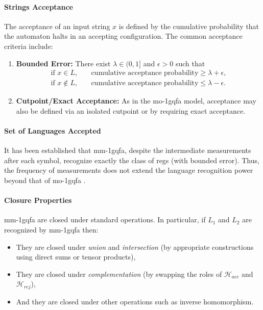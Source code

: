 \paragraph{Strings Acceptance}  
The acceptance of an input string $x$ is defined by the cumulative probability that the automaton halts in an accepting configuration. The common acceptance criteria include:
\begin{enumerate}
  \item \textbf{Bounded Error:} There exist $\lambda\in(0,1]$ and $\epsilon>0$ such that
  \[
  \begin{aligned}
  \text{if } x\in L,&\quad \text{cumulative acceptance probability} \ge \lambda+\epsilon,\\[1mm]
  \text{if } x\notin L,&\quad \text{cumulative acceptance probability} \le \lambda-\epsilon.
  \end{aligned}
  \]
  \item \textbf{Cutpoint/Exact Acceptance:} As in the \gls{mo-1gqfa} model, acceptance may also be defined via an isolated cutpoint or by requiring exact acceptance.
\end{enumerate}

\paragraph{Set of Languages Accepted} 
It has been established that \gls{mm-1gqfa}, despite the intermediate measurements after each symbol, recognize exactly the class of \glspl{reg} (with bounded error). Thus, the frequency of measurements does not extend the language recognition power beyond that of \gls{mo-1gqfa} \cite{li2012characterizations}.

\paragraph{Closure Properties}  
\gls{mm-1gqfa} are closed under standard operations. In particular, if $L_1$ and $L_2$ are recognized by \gls{mm-1gqfa} then:
\begin{itemize}
  \item They are closed under \emph{union} and \emph{intersection} (by appropriate constructions using direct sums or tensor products),
  \item They are closed under \emph{complementation} (by swapping the roles of $\mathcal{H}_{acc}$ and $\mathcal{H}_{rej}$),
  \item And they are closed under other operations such as inverse homomorphism.
\end{itemize}

